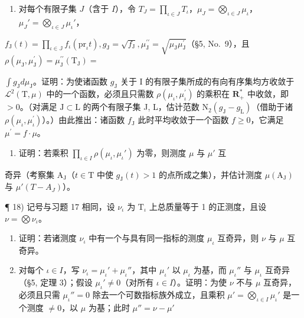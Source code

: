 \begin{enumerate}
\def\labelenumi{\alph{enumi})}
\tightlist
\item
  对每个有限子集 \(J\)（含于 \(I\)），令 \(T_J = \prod_{\iota \in J} T_\iota\)，\(\mu_J = \bigotimes_{\iota \in J} \mu_\iota\)，\(\mu_J' = \bigotimes_{\iota \in J} \mu_\iota'\)，
\end{enumerate}

\(f_{\mathrm{J}}(t) = \prod_{\iota \in \mathbb{J}}f_{\iota}(\mathrm{pr}_{\iota}t), g_{\mathrm{J}} = \sqrt{f_{\mathrm{J}}}, \mu_{\mathrm{J}}^{\prime \prime} = \sqrt{\mu_{\mathrm{J}}\mu_{\mathrm{J}}^{\prime}}\)（§5, No.~9），且 \(\rho (\mu_{\mathrm{J}},\mu_{\mathrm{J}}^{\prime}) = \mu_{\mathrm{J}}^{\prime \prime}(\mathrm{T}_{\mathrm{J}}) =\)

\(\int g_{\mathrm{J}}d\mu_{\mathrm{J}}\)。证明：为使诸函数 \(g_{\mathrm{J}}\) 关于 I 的有限子集所成的有向有序集均方收敛于 \(\mathcal{L}^2 (\mathrm{T},\mu)\) 中的一个函数，必须且只需数 \(\rho (\mu_{\iota},\mu_{\iota}^{\prime})\) 的乘积在 \(\mathbf{R}_{+}^{*}\) 中收敛，即 \(>0\)。（对满足 \(\mathrm{J}\subset \mathrm{L}\) 的两个有限子集 J, L，估计范数 \(\mathrm{N}_2(g_{\mathrm{J}} - g_{\mathrm{L}})\)（借助于诸 \(\rho (\mu_{\iota},\mu_{\iota}^{\prime})\)）。）由此推出：诸函数 \(f_{\mathrm{J}}\) 此时平均收敛于一个函数 \(f\geqslant 0\)，它满足 \(\mu^{\prime} = f\cdot \mu\)。

\begin{enumerate}
\def\labelenumi{\alph{enumi})}
\setcounter{enumi}{1}
\tightlist
\item
  证明：若乘积 \(\prod_{\iota \in I} \rho(\mu_{\iota}, \mu_{\iota}')\) 为零，则测度 \(\mu\) 与 \(\mu'\) 互
\end{enumerate}

奇异（考察集 \(\mathrm{A_J}\)（\(t\in \mathrm{T}\) 中使 \(g_{\mathrm{J}}(t) > 1\) 的点所成之集），并估计测度 \(\mu (\mathrm{A_J})\) 与 \(\mu '(T - A_J)\)）。

¶ 18) 记号与习题 17 相同，设 \(\nu_{\iota}\) 为 \(\mathrm{T}_{\iota}\) 上总质量等于 1 的正测度，且设 \(\nu = \bigotimes \nu_{\iota}\)。

\begin{enumerate}
\def\labelenumi{\alph{enumi})}
\item
  证明：若诸测度 \(\nu_{\iota}\) 中有一个与具有同一指标的测度 \(\mu_{\iota}\) 互奇异，则 \(\nu\) 与 \(\mu\) 互奇异。
\item
  对每个 \(\iota \in I\)，写 \(\nu_{\iota} = \mu_{\iota}' + \mu_{\iota}''\)，其中 \(\mu_{\iota}'\) 以 \(\mu_{\iota}\) 为基，而 \(\mu_{\iota}''\) 与 \(\mu_{\iota}\) 互奇异（§5, 定理 3）；假设 \(\mu_{\iota}' \neq 0\)（对所有 \(\iota \in I\)）。证明：为使 \(\nu\) 不与 \(\mu\) 互奇异，必须且只需 \(\mu_{\iota}'' = 0\) 除去一个可数指标族外成立，且乘积 \(\mu' = \bigotimes_{\iota \in I} \mu_{\iota}'\) 是一个测度 \(\neq 0\)，以 \(\mu\) 为基；此时 \(\mu'' = \nu - \mu'\)
\end{enumerate}

